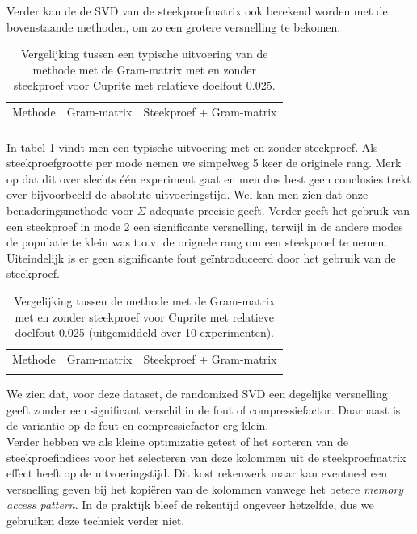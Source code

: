 Verder kan de de SVD van de steekproefmatrix ook berekend worden met de bovenstaande methoden, om zo een grotere versnelling te bekomen.

\begin{table}[H]
\centering
\begin{tabular}{|l|l|l|}
\hline
Methode & Gram-matrix & Steekproef + Gram-matrix\\ \hhline{|=|=|=|}

\end{tabular}
\caption{Vergelijking tussen een typische uitvoering van de methode met de Gram-matrix met en zonder steekproef voor Cuprite met relatieve doelfout 0.025.}
\label{table:randomized-svd-cuprite-test}
\end{table}

In tabel \ref{table:randomized-svd-cuprite-test} vindt men een typische uitvoering met en zonder steekproef. Als steekproefgrootte per mode nemen we simpelweg 5 keer de originele rang. Merk op dat dit over slechts \'e\'en experiment gaat en men dus best geen conclusies trekt over bijvoorbeeld de absolute uitvoeringstijd. Wel kan men zien dat onze benaderingsmethode voor $\Sigma$ adequate precisie geeft. Verder geeft het gebruik van een steekproef in mode 2 een significante versnelling, terwijl in de andere modes de populatie te klein was t.o.v. de orignele rang om een steekproef te nemen. Uiteindelijk is er geen significante fout ge\"introduceerd door het gebruik van de steekproef.

\begin{table}[H]
\centering
\begin{tabular}{|l|l|l|}
\hline
Methode & Gram-matrix & Steekproef + Gram-matrix\\ \hhline{|=|=|=|}

\end{tabular}
\caption{Vergelijking tussen de methode met de Gram-matrix met en zonder steekproef voor Cuprite met relatieve doelfout 0.025 (uitgemiddeld over 10 experimenten).}
\end{table}

We zien dat, voor deze dataset, de randomized SVD een degelijke versnelling geeft zonder een significant verschil in de fout of compressiefactor. Daarnaast is de variantie op de fout en compressiefactor erg klein.\\

Verder hebben we als kleine optimizatie getest of het sorteren van de steekproefindices voor het selecteren van deze kolommen uit de steekproefmatrix effect heeft op de uitvoeringstijd. Dit kost rekenwerk maar kan eventueel een versnelling geven bij het kopi\"eren van de kolommen vanwege het betere \textit{memory access pattern}. In de praktijk bleef de rekentijd ongeveer hetzelfde, dus we gebruiken deze techniek verder niet.\\

